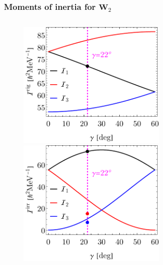 \documentclass{beamer}
\begin{document}
\begin{frame}
	\frametitle{Moments of inertia for $\mathbf{W}_2$}
	\vspace{-0.4cm}
	\begin{columns}
		\begin{column}{0.5\textwidth}
			\begin{figure}
				\centering
				\includegraphics[width=0.74\textwidth]{figures/parity-partners-plots/rigid-mois-fit.pdf}
				\includegraphics[width=0.74\textwidth]{figures/parity-partners-plots/hydrodynamic-mois-fit.pdf}
			\end{figure}		
		\end{column}
		\begin{column}{0.5\textwidth}
			\begin{figure}
				\centering

\end{figure}
\end{column}
\end{columns}
\end{frame}
\end{document}
